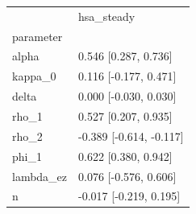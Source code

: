 \begin{tabular}{ll}
\toprule
 & hsa\_steady \\
parameter &  \\
\midrule
alpha & 0.546 [0.287, 0.736] \\
kappa\_0 & 0.116 [-0.177, 0.471] \\
delta & 0.000 [-0.030, 0.030] \\
rho\_1 & 0.527 [0.207, 0.935] \\
rho\_2 & -0.389 [-0.614, -0.117] \\
phi\_1 & 0.622 [0.380, 0.942] \\
lambda\_ez & 0.076 [-0.576, 0.606] \\
n & -0.017 [-0.219, 0.195] \\
\bottomrule
\end{tabular}
